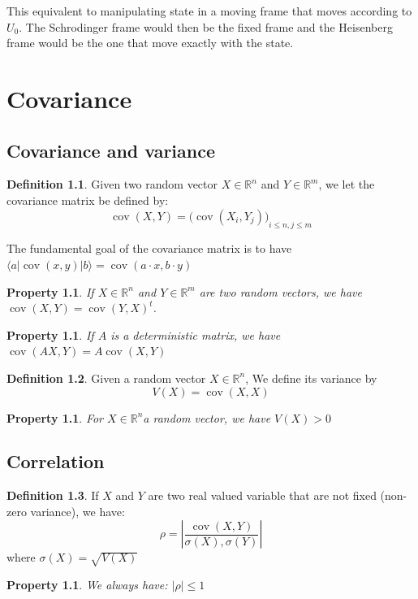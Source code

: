 \documentclass[10pt,a4paper]{report}
\theoremstyle{plain}
\newtheorem{prop}[thm]{Property}
\theoremstyle{definition}
\newtheorem{defn}{Definition}[chapter]
\theoremstyle{remark}
\newcommand{\R}{\ensuremath{\mathbb{R}}}
\newcommand{\ket}[1]{|#1\rangle}
\newcommand{\bra}[1]{\langle#1|}
\renewcommand{\leq}{\leqslant}
\DeclareMathOperator{\cov}{cov}
\begin{document}
This equivalent to manipulating state in a moving frame that moves according to
$U_0$. The Schrodinger frame would then be the fixed frame and the Heisenberg frame
would be the one that move exactly with the state.

\chapter{Covariance}\label{app:cov}

\section{Covariance and variance}

\begin{defn}
  Given two random vector $X \in \R^n$ and $Y \in \R^m$, we let the covariance
  matrix be defined by:
  \[\cov(X,Y) = {\big(\cov(X_i,Y_j)\big)}_{i \leq n, j \leq m}\]
\end{defn}

The fundamental goal of the covariance matrix is to have $\bra a \cov(x,y) \ket
b = \cov(a \cdot x, b \cdot y)$
\begin{prop} If $X \in \R^n$ and $Y \in \R^m$ are two random vectors, we have $\cov(X,Y) = {\cov(Y,X)}^t$.
\end{prop}
\begin{prop} If $A$ is a deterministic matrix, we have $ \cov(A X, Y) = A \cov(X,Y)$
\end{prop}

\begin{defn}
  Given a random vector $X \in \R^n$, We define its variance by
  \[V(X) = \cov(X,X)\]
\end{defn}

\begin{prop} For $X \in \R^n$a random vector, we have $V(X) > 0$
\end{prop}

\section{Correlation}\label{sec:correl}

\begin{defn}
  If $X$ and $Y$ are two real valued variable that are not fixed (non-zero
  variance), we have:
  \[\rho = \left|\frac {\cov(X,Y)}{\sigma(X),\sigma(Y)}\right|\]
  where $\sigma(X) = \sqrt{V(X)}$
\end{defn}

\begin{prop}\label{prop:correl1}
  We always have: $|\rho| \le 1$
\end{prop}
\end{document}
